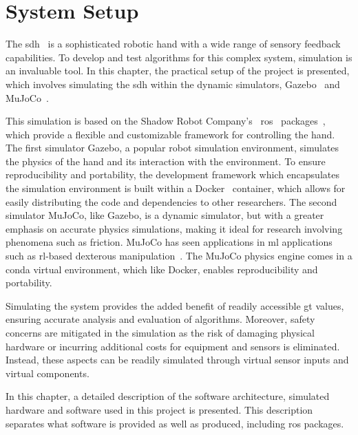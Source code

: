 \chapter{System Setup}\label{ch:system-setup}

The \gls{sdh}~\cite{shadow-dex-hand} is a sophisticated robotic hand with a wide range of sensory feedback capabilities. To develop and test algorithms for this complex system, simulation is an invaluable tool. In this chapter, the practical setup of the project is presented, which involves simulating the \gls{sdh} within the dynamic simulators, Gazebo~\cite{gazebo} and MuJoCo~\cite{todorov2012mujoco}. \medskip

This simulation is based on the Shadow Robot Company's~\cite{shadow-robotics} \gls{ros}~\cite{ros} packages~\cite{shadow-ros-packages}, which provide a flexible and customizable framework for controlling the hand. The first simulator Gazebo, a popular robot simulation environment, simulates the physics of the hand and its interaction with the environment. To ensure reproducibility and portability, the development framework which encapsulates the simulation environment is built within a Docker~\cite{docker} container, which allows for easily distributing the code and dependencies to other researchers. The second simulator MuJoCo, like Gazebo, is a dynamic simulator, but with a greater emphasis on accurate physics simulations, making it ideal for research involving phenomena such as friction. MuJoCo has seen applications in \gls{ml} applications such as \gls{rl}-based dexterous manipulation~\cite{dexterous-object-manipulation, charlesworth2021solving, dexmv:-imitation-learning-for-dexterous-manipulation-from-human-videos}. The MuJoCo physics engine comes in a conda virtual environment, which like Docker, enables reproducibility and portability. \medskip

Simulating the system provides the added benefit of readily accessible \gls{gt} values, ensuring accurate analysis and evaluation of algorithms. Moreover, safety concerns are mitigated in the simulation as the risk of damaging physical hardware or incurring additional costs for equipment and sensors is eliminated. Instead, these aspects can be readily simulated through virtual sensor inputs and virtual components. \medskip

In this chapter, a detailed description of the software architecture, simulated hardware and software used in this project is presented. This description separates what software is provided as well as produced, including \gls{ros} packages.

